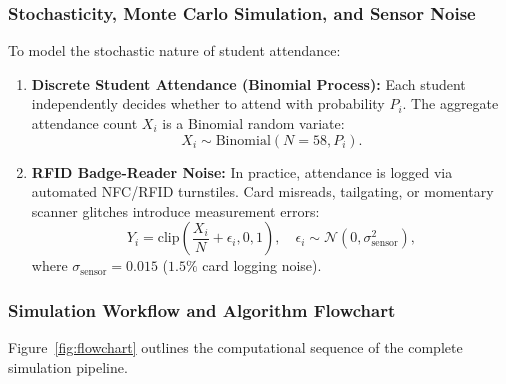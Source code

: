 \documentclass{article}
\begin{document}
\subsubsection{Stochasticity, Monte Carlo Simulation, and Sensor Noise}
To model the stochastic nature of student attendance:
\begin{enumerate}
    \item \textbf{Discrete Student Attendance (Binomial Process):} Each student independently decides whether to attend with probability $P_i$. The aggregate attendance count $X_i$ is a Binomial random variate:
    \begin{equation}
        X_i \sim \mathrm{Binomial}(N = 58, P_i).
    \end{equation}
    \item \textbf{RFID Badge-Reader Noise:} In practice, attendance is logged via automated NFC/RFID turnstiles. Card misreads, tailgating, or momentary scanner glitches introduce measurement errors:
    \begin{equation}
        Y_i = \mathrm{clip}\left( \frac{X_i}{N} + \epsilon_i, 0, 1 \right), \quad \epsilon_i \sim \mathcal{N}(0, \sigma_{\mathrm{sensor}}^2),
    \end{equation}
    where $\sigma_{\mathrm{sensor}} = 0.015$ ($1.5\%$ card logging noise).
\end{enumerate}

\subsubsection{Simulation Workflow and Algorithm Flowchart}
Figure~\ref{fig:flowchart} outlines the computational sequence of the complete simulation pipeline.
\end{document}
